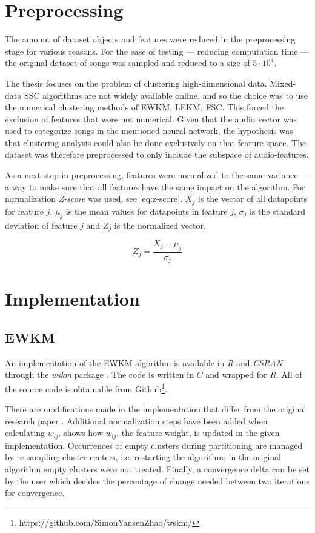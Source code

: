 \documentclass[../report.tex]{subfiles}
\begin{document}
\section{Preprocessing}
The amount of dataset objects and features were reduced in the preprocessing stage for various reasons. For the ease of testing --- reducing computation time --- the original dataset of songs was sampled and reduced to a size of $5 \cdot 10^4$.

The thesis focuses on the problem of clustering high-dimensional data. Mixed-data SSC algorithms are not widely available online, and so the choice was to use the numerical clustering methods of EWKM, LEKM, FSC. This forced the exclusion of features that were not numerical. Given that the audio vector was used to categorize songs in the mentioned neural network, the hypothesis was that clustering analysis could also be done exclusively on that feature-space. The dataset was therefore preprocessed to only include the subspace of audio-features.

As a next step in preprocessing, features were normalized to the same variance --- a way to make sure that all features have the same impact on the algorithm. For normalization \textit{Z-score} was used, see \cref{eq:z-score}. $X_j$ is the vector of all datapoints for feature $j$, $\mu_j$ is the mean values for datapoints in feature $j$, $\sigma_{j}$ is the standard deviation of feature $j$ and $Z_j$ is the normalized vector.

\begin{equation}
  \label{eq:z-score}
  Z_j = \frac{X_j - \mu_j}{\sigma_j}
\end{equation}

\section{Implementation}

\subsection{EWKM}
An implementation of the EWKM algorithm is available in \textit{R} and \textit{CSRAN} through the \textit{wskm} package \cite{wskm2014hz}. The code is written in $C$ and wrapped for $R$. All of the source code is obtainable from Github\footnote{https://github.com/SimonYansenZhao/wskm/}.

There are modifications made in the implementation that differ from the original research paper \cite{Jing2007}. Additional normalization steps have been added when calculating $w_{lj}$.  shows how $w_{lj}$, the feature weight, is updated in the given implementation. Occurrences of empty clusters during partitioning are managed by re-sampling cluster centers, i.e. restarting the algorithm; in the original algorithm empty clusters were not treated. Finally, a convergence delta can be set by the user which decides the percentage of change needed between two iterations for convergence.
\end{document}
